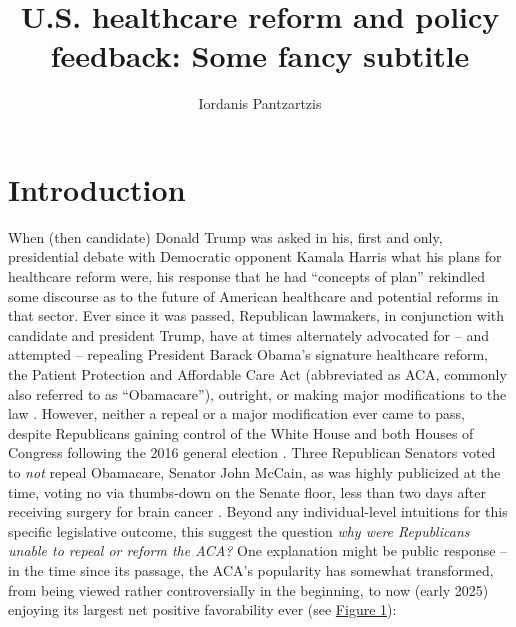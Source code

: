 \documentclass[11pt, xcolor=dvipsnames]{article}
\author[1]{Iordanis Pantzartzis}
\affil[1]{Universität Konstanz, 01/1001158}
\title{U.S. healthcare reform and policy feedback: Some fancy subtitle}
\begin{document}


\restoregeometry

\maketitle

\section*{Introduction}

When (then candidate) Donald Trump was asked in his, first and only, presidential debate with Democratic opponent Kamala Harris what his plans for healthcare reform were, his response that he had \enquote{concepts of plan} \parencite[][]{Trump2024} rekindled some discourse as to the future of American healthcare and potential reforms in that sector. Ever since it was passed, Republican lawmakers, in conjunction with candidate and president Trump, have at times alternately advocated for -- and attempted -- repealing President Barack Obama's signature healthcare reform, the Patient Protection and Affordable Care Act (abbreviated as ACA, commonly also referred to as \enquote{Obamacare}), outright, or making major modifications to the law \parencite[][]{Armour2024}. However, neither a repeal or a major modification ever came to pass, despite Republicans gaining control of the White House and both Houses of Congress following the 2016 general election \parencite[][]{FEC2016}. Three Republican Senators voted to \textit{not} repeal Obamacare, Senator John McCain, as was highly publicized at the time, voting no via thumbs-down on the Senate floor, less than two days after receiving surgery for brain cancer \parencite[][]{Davis2016}. Beyond any individual-level intuitions for this specific legislative outcome, this suggest the question \textit{why were Republicans unable to repeal or reform the ACA?} One explanation might be public response -- in the time since its passage, the ACA's popularity has somewhat transformed, from being viewed rather controversially in the beginning, to now (early 2025) enjoying its largest net positive favorability ever (see \hyperref[fig:aca_fav]{Figure 1}):\\

\end{document}
